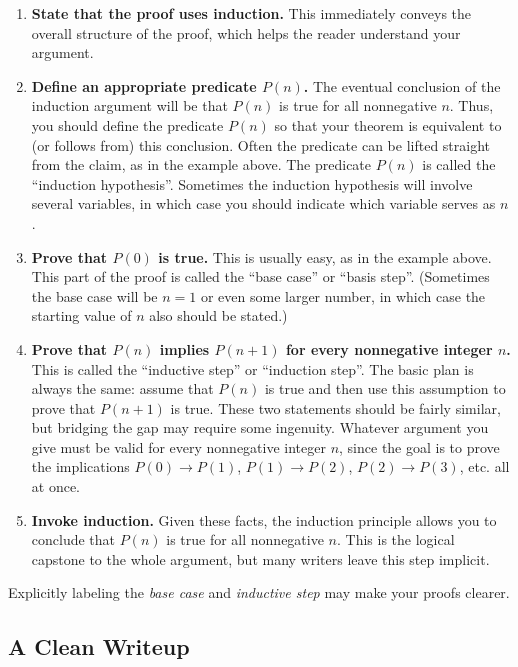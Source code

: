 \begin{enumerate}

\item \textbf{State that the proof uses induction.}  This immediately
conveys the overall structure of the proof, which helps the reader
understand your argument.

\item \textbf{Define an appropriate predicate $P(n)$.}  The eventual
conclusion of the induction argument will be that $P(n)$ is true for all
nonnegative $n$.  Thus, you should define the predicate $P(n)$ so that your
theorem is equivalent to (or follows from) this conclusion.  Often the
predicate can be lifted straight from the claim, as in the example above.
The predicate $P(n)$ is called the ``induction hypothesis''.  Sometimes
the induction hypothesis will involve several variables, in which case you
should indicate which variable serves as $n$.

\item \textbf{Prove that $P(0)$ is true.}  This is usually easy, as in the
example above.  This part of the proof is called the ``base case'' or
``basis step''.  (Sometimes the base case will be $n=1$ or even some
larger number, in which case the starting value of $n$ also should be
stated.)

\item \textbf{Prove that $P(n)$ implies $P(n+1)$ for every nonnegative
integer $n$.}  This is called the ``inductive step'' or ``induction step''.
The basic plan is always the same: assume that $P(n)$ is true and then use
this assumption to prove that $P(n+1)$ is true.  These two statements
should be fairly similar, but bridging the gap may require some ingenuity.
Whatever argument you give must be valid for every nonnegative integer $n$,
since the goal is to prove the implications $P(0) \rightarrow P(1)$, $P(1)
\rightarrow P(2)$, $P(2) \rightarrow P(3)$, etc. all at once.

\item \textbf{Invoke induction.}  Given these facts, the induction
  principle allows you to conclude that $P(n)$ is true for all nonnegative
  $n$.  This is the logical capstone to the whole argument, but many
  writers leave this step implicit.

\end{enumerate}
%
Explicitly labeling the \textit{base case} and \textit{inductive step} may
make your proofs clearer.

\subsection{A Clean Writeup}

